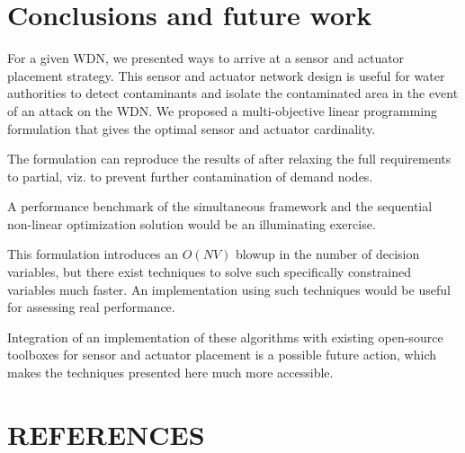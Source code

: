 \documentclass[authoryear,preprint,review,12pt]{elsarticle}
\begin{document}
\section{Conclusions and future work}

For a given WDN, we presented ways to arrive at a sensor and actuator
placement strategy. This sensor and actuator network design is useful
for water authorities to detect contaminants and isolate the contaminated
area in the event of an attack on the WDN. We proposed a multi-objective
linear programming formulation that gives the optimal sensor and actuator
cardinality.

The formulation can reproduce the results of \cite{palleti_actuator_2018} after relaxing
the full requirements to partial, viz. to prevent further contamination
of demand nodes.

A performance benchmark of the simultaneous framework and the sequential
non-linear optimization solution would be an illuminating exercise.

This formulation introduces an $O(NV)$ blowup in the number of decision
variables, but there exist techniques to solve such specifically constrained
variables much faster. An implementation using such techniques would
be useful for assessing real performance.

Integration of an implementation of these algorithms with existing
open-source toolboxes for sensor and actuator placement is a possible
future action, which makes the techniques presented here much more
accessible.

\section{REFERENCES}



\batchmode
\end{document}

